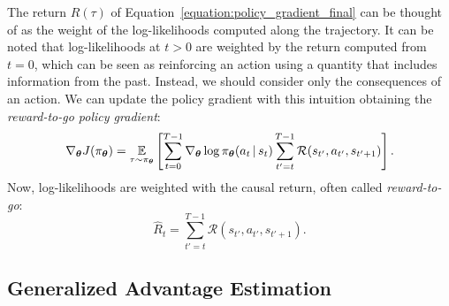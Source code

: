 %
\begin{remark*}
%
The return $R(\tau)$ of Equation~\eqref{equation:policy_gradient_final} can be thought of as the weight of the log-likelihoods computed along the trajectory.
It can be noted that log-likelihoods at $t > 0$ are weighted by the return computed from $t=0$, which can be seen as reinforcing an action using a quantity that includes information from the past.
Instead, we should consider only the consequences of an action.
We can update the policy gradient with this intuition obtaining the \emph{reward-to-go policy gradient}:
%
\begin{equation}
    \label{equation:policy_gradient_reward_to_go}
    \nabla_{\boldsymbol{\theta}} J(\pi_{\boldsymbol{\theta}})
    = \operatorname*{\mathbb{E}}_{\tau \sim \pi_{\boldsymbol{\theta}}} \left[ \sum_{t=0}^{T-1} \nabla_{\boldsymbol{\theta}} \log \pi_{\boldsymbol{\theta}}(a_t \operatorname{\mid} s_t) \sum_{t'=t}^{T-1} \mathcal{R}(s_{t'}, a_{t'}, s_{t'+1}) \right] .
\end{equation}
%
Now, log-likelihoods are weighted with the causal return, often called \emph{reward-to-go}:
%
\begin{equation*}
    \hat{R}_t = \sum_{t'=t}^{T-1} \mathcal{R}(s_{t'}, a_{t'}, s_{t'+1}) .
\end{equation*}
%
\end{remark*}

\subsection{Generalized Advantage Estimation}
\label{sec:gae}

